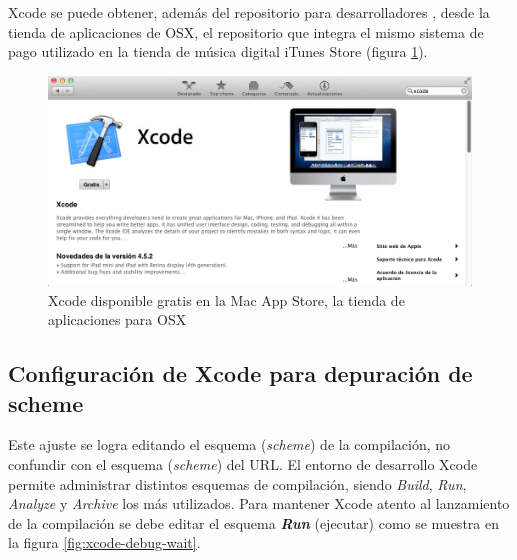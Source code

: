 Xcode se puede obtener, además del repositorio para desarrolladores \cite{apple-repositorio}, desde la tienda de aplicaciones de OSX, el repositorio que integra el mismo sistema de pago utilizado en la tienda de música digital iTunes Store (figura \ref{fig:xcode-appstore}).
\begin{figure}[H]
	\centering
	\includegraphics[scale=0.4]{imgs/xcode-appstore.png} 
	\caption{Xcode disponible gratis en la Mac App Store, la tienda de aplicaciones para OSX}
	\label{fig:xcode-appstore}
\end{figure}  

		\subsection{Configuración de Xcode para depuración de scheme}
		\label{anexo:xcode-debug}
		Este ajuste se logra editando el esquema (\textit{scheme}) de la compilación, no confundir con el esquema (\textit{scheme}) del URL. El entorno de desarrollo Xcode permite administrar distintos esquemas de compilación, siendo \textit{Build}, \textit{Run}, \textit{Analyze} y \textit{Archive} los más utilizados. Para mantener Xcode atento al lanzamiento de la compilación se debe editar el esquema \textbf{\textit{Run}} (ejecutar) como se muestra en la figura \ref{fig:xcode-debug-wait}.
  

